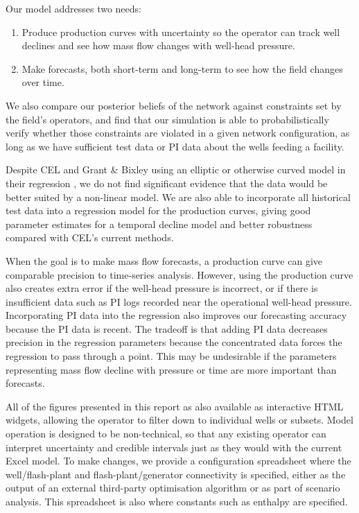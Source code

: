 \documentclass[a4paper, 12pt]{article}
\begin{document}
Our model addresses two needs:
\begin{enumerate}
\item Produce production curves with uncertainty so the operator can track well declines and see how mass flow changes with well-head pressure.
\item Make forecasts, both short-term and long-term to see how the field changes over time.
\end{enumerate}
We also compare our posterior beliefs of the network against constraints set by the field's operators, and find that our simulation is able to probabilistically verify whether those constraints are violated in a given network configuration, as long as we have sufficient test data or PI data about the wells feeding a facility.

Despite CEL and Grant \& Bixley using an elliptic or otherwise curved model in their regression \cite{Grant:2011}, we do not find significant evidence that the data would be better suited by a non-linear model. We are also able to incorporate all historical test data into a regression model for the production curves, giving good parameter estimates for a temporal decline model and better robustness compared with CEL's current methods.

When the goal is to make mass flow forecasts, a production curve can give comparable precision to time-series analysis. However, using the production curve also creates extra error if the well-head pressure is incorrect, or if there is insufficient data such as PI logs recorded near the operational well-head pressure. Incorporating PI data into the regression also improves our forecasting accuracy because the PI data is recent. The tradeoff is that adding PI data decreases precision in the regression parameters because the concentrated data forces the regression to pass through a point. This may be undesirable if the parameters representing mass flow decline with pressure or time are more important than forecasts.

All of the figures presented in this report as also available as interactive HTML widgets, allowing the operator to filter down to individual wells or subsets. Model operation is designed to be non-technical, so that any existing operator can interpret uncertainty and credible intervals just as they would with the current Excel model. To make changes, we provide a configuration spreadsheet where the well/flash-plant and flash-plant/generator connectivity is specified, either as the output of an external third-party optimisation algorithm \cite{Fox:2018} or as part of scenario analysis. This spreadsheet is also where constants such as enthalpy are specified.
\end{document}
